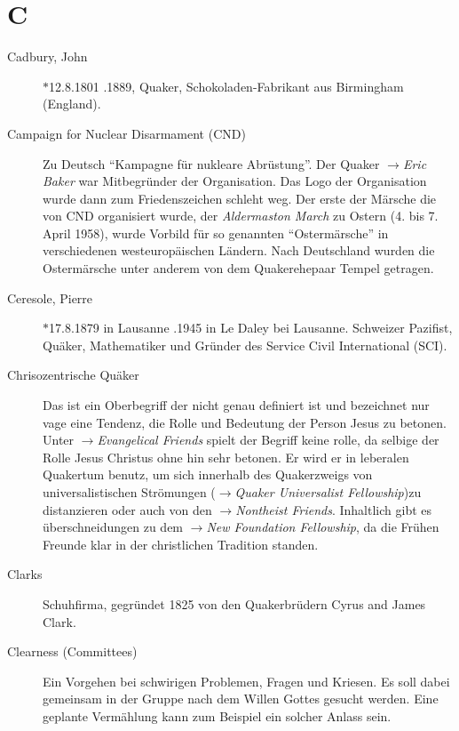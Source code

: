 \section*{C}

\articlesize

\begin{description}

 \item[Cadbury, John] $\ast$12.8.1801 .1889, Quaker,
Schokoladen-Fabrikant aus Birmingham (England).

 \item[Campaign for Nuclear Disarmament (CND)] Zu Deutsch ``Kampagne für
nukleare Abrüstung''. Der Quaker $\to$\textit{Eric Baker} war Mitbegründer der
Organisation. Das Logo der Organisation wurde dann zum Friedenszeichen schleht
weg. Der erste der Märsche die von CND organisiert wurde, der
\textit{Aldermaston March} zu Ostern (4. bis 7. April 1958), wurde Vorbild für
so genannten ``Ostermärsche'' in verschiedenen westeuropäischen Ländern. Nach
Deutschland wurden die Ostermärsche unter anderem von dem Quakerehepaar Tempel
getragen.

 \item[Ceresole, Pierre] $\ast$17.8.1879 in Lausanne .1945 in Le Daley
bei Lausanne. Schweizer Pazifist, Quäker, Mathematiker und Gründer des Service
Civil International (SCI).

 \item[Chrisozentrische Quäker] Das ist ein Oberbegriff der nicht genau
definiert ist und bezeichnet nur vage eine Tendenz, die Rolle und Bedeutung der
Person Jesus zu betonen. Unter $\to$\textit{Evangelical Friends} spielt der
Begriff keine rolle, da selbige der Rolle Jesus Christus ohne hin sehr betonen.
Er wird er in leberalen Quakertum benutz, um sich innerhalb des Quakerzweigs von
universalistischen Strömungen ($\to$\textit{Quaker Universalist Fellowship})zu
distanzieren oder auch von den $\to$\textit{Nontheist Friends}. Inhaltlich gibt
es überschneidungen zu dem $\to$\textit{New Foundation Fellowship}, da die
Frühen Freunde klar in der christlichen Tradition standen.

 \item[Clarks] Schuhfirma, gegründet 1825 von den Quakerbrüdern Cyrus and James
Clark.
 
 \item[Clearness (Committees)] Ein Vorgehen bei schwirigen Problemen, Fragen und
Kriesen. Es soll dabei gemeinsam in der Gruppe nach dem Willen Gottes gesucht
werden. Eine geplante Vermählung kann zum Beispiel ein solcher Anlass sein.


\end{description}
